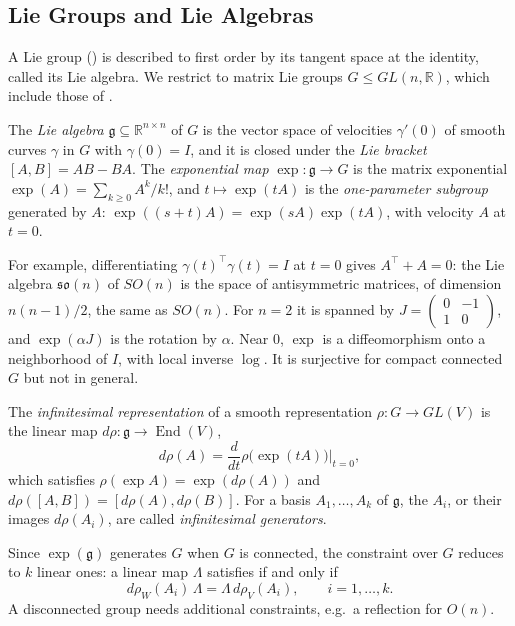 \documentclass[mathematics,review,submit,moreauthors]{Definitions/mdpi}
\begin{document}
\subsection{Lie Groups and Lie Algebras}\label{sec:lie-algebra}

A Lie group () is described to first order by its tangent space at the identity, called its Lie algebra.
We restrict to matrix Lie groups $G\le GL(n,\mathbb{R})$, which include those of .

\begin{Definition}\label{def:lie-algebra}
    The \emph{Lie algebra} $\mathfrak{g}\subseteq\mathbb{R}^{n\times n}$ of $G$ is the vector space of velocities $\gamma'(0)$ of smooth curves $\gamma$ in $G$ with $\gamma(0)=I$, and it is closed under the \emph{Lie bracket} $[A,B]=AB-BA$.
    The \emph{exponential map} $\exp:\mathfrak{g}\to G$ is the matrix exponential $\exp(A)=\sum_{k\ge0}A^k/k!$, and $t\mapsto\exp(tA)$ is the \emph{one-parameter subgroup} generated by $A$: $\exp((s+t)A)=\exp(sA)\exp(tA)$, with velocity $A$ at $t=0$.
\end{Definition}

For example, differentiating $\gamma(t)^\top\gamma(t)=I$ at $t=0$ gives $A^\top+A=0$: the Lie algebra $\mathfrak{so}(n)$ of $SO(n)$ is the space of antisymmetric matrices, of dimension $n(n-1)/2$, the same as $SO(n)$.
For $n=2$ it is spanned by $J=\left(\begin{smallmatrix}0&-1\\1&0\end{smallmatrix}\right)$, and $\exp(\alpha J)$ is the rotation by $\alpha$.
Near $0$, $\exp$ is a diffeomorphism onto a neighborhood of $I$, with local inverse $\log$.
It is surjective for compact connected $G$ but not in general.

\begin{Definition}\label{def:infinitesimal-generators}
    The \emph{infinitesimal representation} of a smooth representation $\rho:G\to GL(V)$ is the linear map $d\rho:\mathfrak{g}\to\operatorname{End}(V)$,
    \[
        d\rho(A)=\frac{d}{dt}\rho\big(\exp(tA)\big)\Big\vert_{t=0},
    \]
    which satisfies $\rho(\exp A)=\exp(d\rho(A))$ and $d\rho([A,B])=[d\rho(A),d\rho(B)]$.
    For a basis $A_1,\dots,A_k$ of $\mathfrak{g}$, the $A_i$, or their images $d\rho(A_i)$, are called \emph{infinitesimal generators}.
\end{Definition}

Since $\exp(\mathfrak{g})$ generates $G$ when $G$ is connected, the constraint over $G$ reduces to $k$ linear ones: a linear map $\Lambda$ satisfies  if and only if
\begin{equation}\label{eq:lie-algebra-equivariance}
    d\rho_W(A_i)\,\Lambda=\Lambda\,d\rho_V(A_i),\qquad i=1,\dots,k.
\end{equation}
A disconnected group needs additional constraints, e.g.\ a reflection for $O(n)$.
\end{document}
